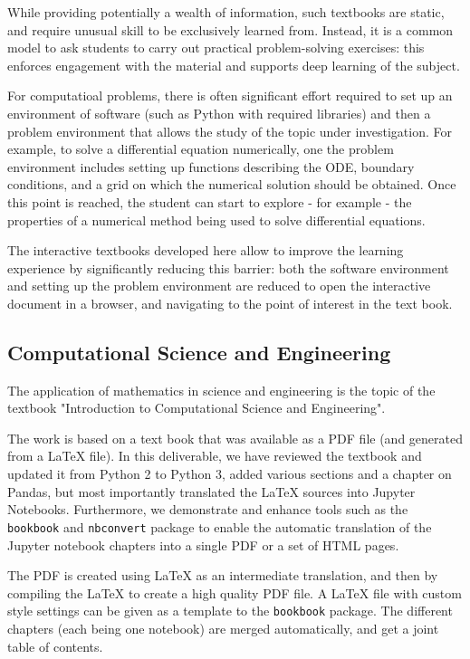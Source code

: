 \documentclass{deliverablereport}
\begin{document}
While providing potentially a wealth of information, such textbooks
are static, and require unusual skill to be exclusively learned
from. Instead, it is a common model to ask students to carry out
practical problem-solving exercises: this enforces engagement with the
material and supports deep learning of the subject.

For computatioal problems, there is often significant effort required
to set up an environment of software (such as Python with required
libraries) and then a problem environment that allows the study of the
topic under investigation. For example, to solve a differential
equation numerically, one the problem environment includes setting up
functions describing the ODE, boundary conditions, and a grid on which
the numerical solution should be obtained. Once this point is reached,
the student can start to explore - for example - the properties of a
numerical method being used to solve differential equations.

The interactive textbooks developed here allow to improve the
learning experience by significantly reducing this barrier: both the
software environment and setting up the problem environment are
reduced to open the interactive document in a browser, and navigating
to the point of interest in the text book.

\subsection{Computational Science and Engineering}

The application of mathematics in science and engineering is the topic
of the textbook "Introduction to Computational Science and
Engineering".

The work is based on a text book that was available as a PDF file (and
generated from a \LaTeX{} file). In this deliverable, we have reviewed
the textbook and updated it from Python 2 to Python 3, added various
sections and a chapter on Pandas, but most importantly translated the
LaTeX sources into Jupyter Notebooks. Furthermore, we demonstrate and
enhance tools such as the \texttt{bookbook} and \texttt{nbconvert}
package to enable the automatic translation of the Jupyter notebook
chapters into a single PDF or a set of HTML pages.

The PDF is created using LaTeX as an intermediate translation, and
then by compiling the LaTeX to create a high quality PDF file. A LaTeX
file with custom style settings can be given as a template to the
\texttt{bookbook} package. The different chapters (each being one notebook)
are merged automatically, and get a joint table of contents.
\end{document}
